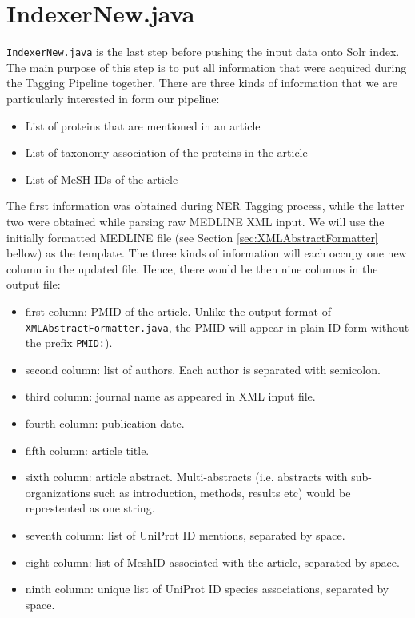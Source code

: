 
\section{IndexerNew.java}

\texttt{IndexerNew.java} is the last step before pushing the input data onto Solr index. The main purpose of this step is to put all information that were acquired during the Tagging Pipeline together. There are three kinds of information that we are particularly interested in form our pipeline:

\begin{itemize}
\item List of proteins that are mentioned in an article
\item List of taxonomy association of the proteins in the article
\item List of MeSH IDs of the article
\end{itemize}

The first information was obtained during NER Tagging process, while the latter two were obtained while parsing raw MEDLINE XML input. We will use the initially formatted MEDLINE file (see Section \ref{sec:XMLAbstractFormatter} bellow) as the template. The three kinds of information will each occupy one new column in the updated file. Hence, there would be then nine columns in the output file:

\begin{itemize}
\item first column: PMID of the article. Unlike the output format of \texttt{XMLAbstractFormatter.java}, the PMID will appear in plain ID form without the prefix \texttt{PMID:}).
\item second column: list of authors. Each author is separated with semicolon.
\item third column: journal name as appeared in XML input file.
\item fourth column: publication date.
\item fifth column: article title.
\item sixth column: article abstract. Multi-abstracts (i.e. abstracts with sub-organizations such as introduction, methods, results etc) would be represtented as one string.
\item seventh column: list of UniProt ID mentions, separated by space.
\item eight column: list of MeshID associated with the article, separated by space.
\item ninth column: unique list of UniProt ID species associations, separated by space.
\end{itemize}

